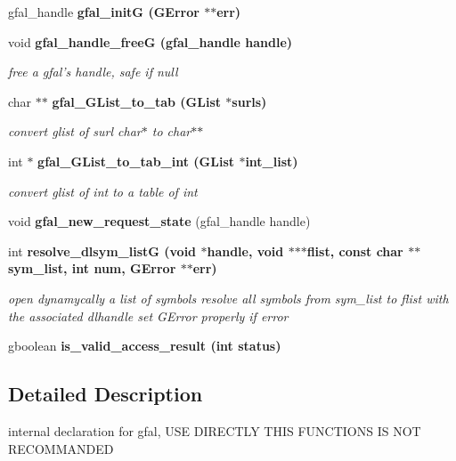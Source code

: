 \begin{CompactItemize}
\item 
gfal\_\-handle \bf{gfal\_\-init\-G} (GError $\ast$$\ast$err)
\item 
void \bf{gfal\_\-handle\_\-free\-G} (gfal\_\-handle handle)\label{gfal__common__internal_8h_9dbd943eaed291897d852fc3ae560058}

\begin{CompactList}\small\item\em free a gfal's handle, safe if null \item\end{CompactList}\item 
char $\ast$$\ast$ \bf{gfal\_\-GList\_\-to\_\-tab} (GList $\ast$surls)
\begin{CompactList}\small\item\em convert glist of surl char$\ast$ to char$\ast$$\ast$ \item\end{CompactList}\item 
int $\ast$ \bf{gfal\_\-GList\_\-to\_\-tab\_\-int} (GList $\ast$int\_\-list)
\begin{CompactList}\small\item\em convert glist of int to a table of int \item\end{CompactList}\item 
void \textbf{gfal\_\-new\_\-request\_\-state} (gfal\_\-handle handle)\label{gfal__common__internal_8h_3453c8a22faa54f7bf3278d5ecd7785d}

\item 
int \bf{resolve\_\-dlsym\_\-list\-G} (void $\ast$handle, void $\ast$$\ast$$\ast$flist, const char $\ast$$\ast$sym\_\-list, int num, GError $\ast$$\ast$err)\label{gfal__common__internal_8h_0323a4ab58106e316851c1ae06148e28}

\begin{CompactList}\small\item\em open dynamycally a list of symbols resolve all symbols from sym\_\-list to flist with the associated dlhandle set GError properly if error \item\end{CompactList}\item 
gboolean \bf{is\_\-valid\_\-access\_\-result} (int status)
\end{CompactItemize}


\subsection{Detailed Description}
internal declaration for gfal, USE DIRECTLY THIS FUNCTIONS IS NOT RECOMMANDED 

